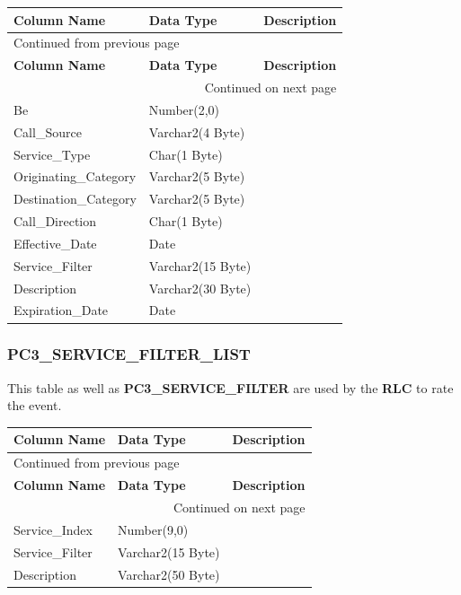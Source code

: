 \documentclass[12pt,twoside]{article}
\begin{document}
\begin{longtable}{l|l|l}
\hline
\textbf{Column Name} & \textbf{Data Type} & \textbf{Description}\\
\hline
\endfirsthead
\multicolumn{3}{l}{Continued from previous page} \\
\hline

\textbf{Column Name} & \textbf{Data Type} & \textbf{Description} \\

\hline
\endhead
\hline\multicolumn{3}{r}{Continued on next page} \\
\endfoot
\endlastfoot
\hline
Be & Number(2,0) & \\
Call\_Source & Varchar2(4 Byte) & \\
Service\_Type & Char(1 Byte) & \\
Originating\_Category & Varchar2(5 Byte) & \\
Destination\_Category & Varchar2(5 Byte) & \\
Call\_Direction & Char(1 Byte) & \\
Effective\_Date & Date & \\
Service\_Filter & Varchar2(15 Byte) & \\
Description & Varchar2(30 Byte) & \\
Expiration\_Date & Date & \\
\hline
\end{longtable}

\normalsize

\subsubsection{PC3\_SERVICE\_FILTER\_LIST}
\label{sec:orgheadline123}
This table as well as \textbf{PC3\_SERVICE\_FILTER} are used by
the \textbf{RLC} to rate the event.
\footnotesize
\begin{longtable}{l|l|l}
\hline
\textbf{Column Name} & \textbf{Data Type} & \textbf{Description}\\
\hline
\endfirsthead
\multicolumn{3}{l}{Continued from previous page} \\
\hline

\textbf{Column Name} & \textbf{Data Type} & \textbf{Description} \\

\hline
\endhead
\hline\multicolumn{3}{r}{Continued on next page} \\
\endfoot
\endlastfoot
\hline
Service\_Index & Number(9,0) & \\
Service\_Filter & Varchar2(15 Byte) & \\
Description & Varchar2(50 Byte) & \\
\hline
\end{longtable}
\end{document}
